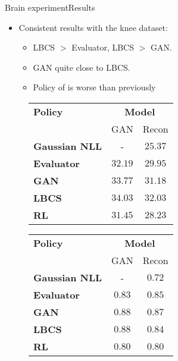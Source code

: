 \begin{frame}{Brain experiment}{Results}
    \begin{itemize}
        \item Consistent results with the knee dataset:
        \begin{itemize}
            \item LBCS $>$ Evaluator, LBCS $>$ GAN.
            \item GAN quite close to LBCS.
            \item Policy of \cite{bakker2020experimental} is worse than previously
        \end{itemize}
    \end{itemize}
\vfill
\begin{figure}[h]
    \begin{minipage}[c]{0.48\textwidth}
    \begin{center}
        \begin{tabular}{lcc}
         \toprule
        \multirow{1}{*}{\textbf{Policy}}& \multicolumn{2}{c}{\textbf{Model}}\\
        \cmidrule{2-3} & GAN & Recon\\
        \midrule
        \textbf{Gaussian NLL}  & - & $25.37$\\
        \textbf{Evaluator} & $32.19$& $29.95$\\
        \textbf{GAN} & $33.77$& $31.18$\\
        \midrule
        \textbf{LBCS} & $\mathbf{34.03}$& $\mathbf{32.03}$\\
        \textbf{RL} & $31.45$& $28.23$ \\
        \bottomrule
        \end{tabular}
    \end{center}
    \end{minipage}
    \hfill
    \begin{minipage}[c]{0.48\textwidth}
    \begin{center}
         \begin{tabular}{lcc}
         \toprule
        \multirow{1}{*}{\textbf{Policy}}& \multicolumn{2}{c}{\textbf{Model}}\\
        \cmidrule{2-3} &GAN & Recon\\
        \midrule
        \textbf{Gaussian NLL} & - & $0.72$\\
        \textbf{Evaluator} & $0.83$& $0.85$\\
        \textbf{GAN} & $\mathbf{0.88}$ & $\mathbf{0.87}$\\
        \midrule
        \textbf{LBCS} &  $\mathbf{0.88}$& $0.84$\\
        \textbf{RL} &$0.80$ & $0.80$\\
        \bottomrule
        \end{tabular}
    \end{center}
    \end{minipage}
    \end{figure}
\end{frame}

